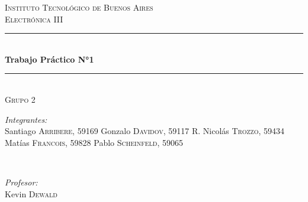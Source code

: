 \begin{titlepage}

\newcommand{\HRule}{\rule{\linewidth}{0.5mm}} %

\center %
    

\textsc{\LARGE  Instituto Tecnológico de Buenos Aires}\\[1.5cm] %
\textsc{\large Electrónica III}\\[0.5cm] %


\HRule \\[0.4cm]
{ \huge \bfseries Trabajo Práctico N°1}\\[0.4cm] %
\HRule \\[1.5cm]
    \textsc{\large Grupo 2}\\[0.5cm] 

\begin{minipage}{0.5\textwidth}
\begin{flushleft} \large
\emph{Integrantes:}\\
Santiago \textsc{Arribere, 59169} \newline %
Gonzalo \textsc{Davidov, 59117}\newline
R. Nicolás \textsc{Trozzo, 59434}\newline
Matías \textsc{Francois, 59828}\newline
Pablo \textsc{Scheinfeld, 59065}

\end{flushleft}
\end{minipage}
~
\begin{minipage}{0.4\textwidth}
\begin{flushright} \large
\emph{Profesor:} \\
Kevin \textsc{Dewald} %
\end{flushright}
\end{minipage}\\[1cm]


\end{titlepage}
